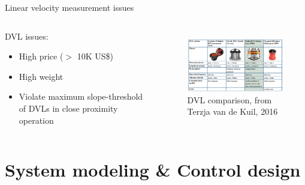 \documentclass{beamer}
\begin{document}
\begin{frame}{Linear velocity measurement issues}
	\begin{columns}[t]
		\begin{block}{DVL issues:}
			\begin{itemize}
				\item High price ($>$ 10K US\$)
				\item High weight
				\item Violate maximum slope-threshold of DVLs in close proximity operation
			\end{itemize}
		\end{block}
		\begin{figure}
			\includegraphics[width = 80mm]{Images/DVL_prices.png}\\ \vspace{0.2cm}
			 DVL comparison, \tiny from Terzja van de Kuil, 2016
		\end{figure}
		
	\end{columns} 
\end{frame}

\section{System modeling \& Control design}
\end{document}
